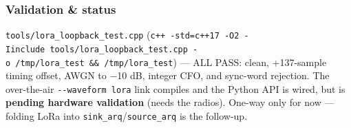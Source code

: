 \documentclass[
  10pt,
]{article}
\begin{document}
\hypertarget{validation--status}{%
\subsubsection{Validation \& status}\label{validation--status}}

\texttt{tools/lora\_loopback\_test.cpp}
(\texttt{c++\ -std=c++17\ -O2\ -Iinclude\ tools/lora\_loopback\_test.cpp\ -o\ /tmp/lora\_test\ \&\&\ /tmp/lora\_test})
--- ALL PASS: clean, +137-sample timing offset, AWGN to −10 dB, integer
CFO, and sync-word rejection. The over-the-air
\texttt{-\/-waveform\ lora} link compiles and the Python API is wired,
but is \textbf{pending hardware validation} (needs the radios). One-way
only for now --- folding LoRa into
\texttt{sink\_arq}/\texttt{source\_arq} is the follow-up.
\end{document}
